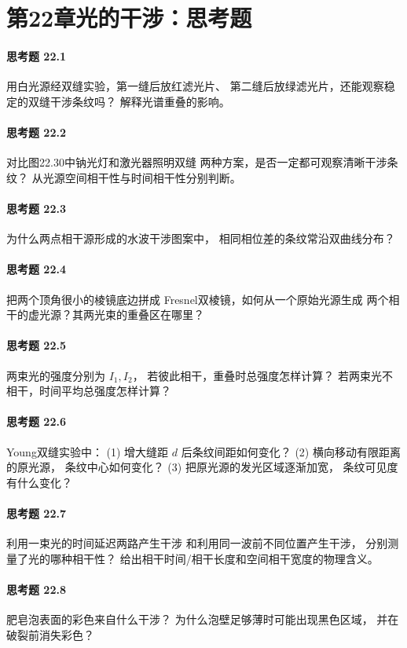 \section*{第22章\quad 光的干涉：思考题}
\paragraph{思考题 22.1}
用白光源经双缝实验，第一缝后放红滤光片、
第二缝后放绿滤光片，还能观察稳定的双缝干涉条纹吗？
解释光谱重叠的影响。
\paragraph{思考题 22.2}
对比图22.30中钠光灯和激光器照明双缝
两种方案，是否一定都可观察清晰干涉条纹？
从光源空间相干性与时间相干性分别判断。
\paragraph{思考题 22.3}
为什么两点相干源形成的水波干涉图案中，
相同相位差的条纹常沿双曲线分布？
\paragraph{思考题 22.4}
把两个顶角很小的棱镜底边拼成
Fresnel双棱镜，如何从一个原始光源生成
两个相干的虚光源？其两光束的重叠区在哪里？
\paragraph{思考题 22.5}
两束光的强度分别为 \(I_1,I_2\)，
若彼此相干，重叠时总强度怎样计算？
若两束光不相干，时间平均总强度怎样计算？
\paragraph{思考题 22.6}
Young双缝实验中：
(1) 增大缝距 \(d\) 后条纹间距如何变化？
(2) 横向移动有限距离的原光源，
条纹中心如何变化？
(3) 把原光源的发光区域逐渐加宽，
条纹可见度有什么变化？
\paragraph{思考题 22.7}
利用一束光的时间延迟两路产生干涉
和利用同一波前不同位置产生干涉，
分别测量了光的哪种相干性？
给出相干时间/相干长度和空间相干宽度的物理含义。
\paragraph{思考题 22.8}
肥皂泡表面的彩色来自什么干涉？
为什么泡壁足够薄时可能出现黑色区域，
并在破裂前消失彩色？
